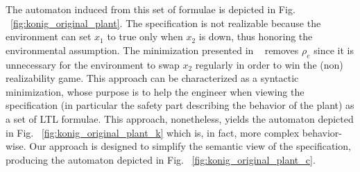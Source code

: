The automaton induced from this set of formulae is depicted in Fig. ~\ref{fig:konig_original_plant}. The specification is not realizable because the environment can set $x_1$ to true only when $x_2$ is down, thus honoring the environmental assumption. The minimization presented in ~\cite{DBLP:conf/hvc/KonighoferHB10} removes $\rho_e$ since it is unnecessary for the environment to swap $x_2$ regularly in order to win the (non) realizability game. This approach can be characterized as a syntactic minimization, whose purpose is to help the engineer when viewing the specification (in particular the safety part describing the behavior of the plant) as a set of LTL formulae. This approach, nonetheless, yields the automaton depicted in Fig. ~\ref{fig:konig_original_plant_k} which is, in fact, more complex behavior-wise. Our approach is designed to simplify the semantic view of the specification, producing the automaton depicted in Fig. ~\ref{fig:konig_original_plant_c}. 

